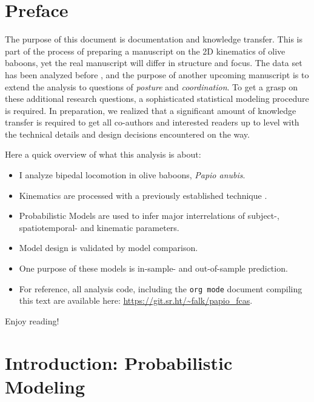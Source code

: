 \clearpage


\section{Preface}
\label{sec:orgcfa10a1}
The purpose of this document is documentation and knowledge transfer.
This is part of the process of preparing a manuscript on the 2D kinematics of olive baboons, yet the real manuscript will differ in structure and focus.
The data set has been analyzed before \citep[currently under review, ][]{Druelle2021}, and the purpose of another upcoming manuscript is to extend the analysis to questions of \emph{posture} and \emph{coordination}.
To get a grasp on these additional research questions, a sophisticated statistical modeling procedure is required.
In preparation, we realized that a significant amount of knowledge transfer is required to get all co-authors and interested readers up to level with the technical details and design decisions encountered on the way.


Here a quick overview of what this analysis is about:
\begin{itemize}
\item I analyze bipedal locomotion in olive baboons, \emph{Papio anubis}.
\item Kinematics are processed with a previously established technique \citep["Fourier Coefficient Affine Superimposition", cf.][]{Mielke2019}.
\item Probabilistic Models are used to infer major interrelations of subject-, spatiotemporal- and kinematic parameters.
\item Model design is validated by model comparison.
\item One purpose of these models is in-sample- and out-of-sample prediction.
\item For reference, all analysis code, including the \texttt{org mode} document compiling this text are available here: \url{https://git.sr.ht/\~falk/papio\_fcas}.
\end{itemize}



Enjoy reading!


\FloatBarrier
\clearpage
\section{Introduction: Probabilistic Modeling}
\label{sec:org2074548}
